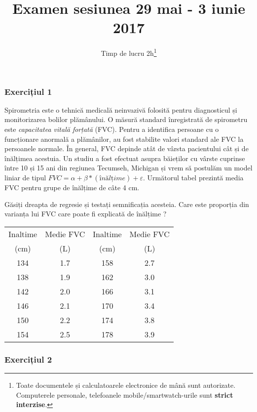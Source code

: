 \documentclass[]{article}
\title{Examen sesiunea 29 mai - 3 iunie 2017}
\subtitle{Timp de lucru 2h\footnote{Toate documentele și calculatoarele
  electronice de mână sunt autorizate. Computerele personale,
  telefoanele mobile/smartwatch-urile sunt \textbf{strict interzise}.}}
\author{}
\date{}
\begin{document}
\maketitle

\thispagestyle{fancy}

\subsubsection{Exercițiul 1}\label{exercitiul-1}

Spirometria este o tehnică medicală neinvazivă folosită pentru
diagnosticul și monitorizarea bolilor plămânului. O măsură standard
înregistrată de spirometru este \emph{capacitatea vitală forțată} (FVC).
Pentru a identifica persoane cu o funcționare anormală a plămânilor, au
fost stabilite valori standard ale FVC la persoanele normale. În
general, FVC depinde atât de vârsta pacientului cât și de înălțimea
acestuia. Un studiu a fost efectuat asupra băieților cu vârste cuprinse
între 10 și 15 ani din regiunea Tecumseh, Michigan și vrem să postulăm
un model liniar de tipul
\(FVC = \alpha + \beta*(înălțime) + \varepsilon\). Următorul tabel
prezintă media FVC pentru grupe de înălțime de câte 4 cm.

Găsiți dreapta de regresie și testați semnificația acesteia. Care este
proporția din varianța lui FVC care poate fi explicată de înălțime ?

\begin{center}
\begin{table}[ht]
\centering
  \begin{tabular}{cccc}
  \toprule
    Inaltime & Medie FVC & Inaltime & Medie FVC\\
    (cm) & (L) & (cm) & (L)\\
  \midrule
    134 & 1.7 & 158 & 2.7\\
    138 & 1.9 & 162 & 3.0\\
    142 & 2.0 & 166 & 3.1\\
    146 & 2.1 & 170 & 3.4\\
    150 & 2.2 & 174 & 3.8\\
    154 & 2.5 & 178 & 3.9\\
  \bottomrule
    
  \end{tabular}
\end{table}
\end{center}

\subsubsection{Exercițiul 2}\label{exercitiul-2}
\end{document}
